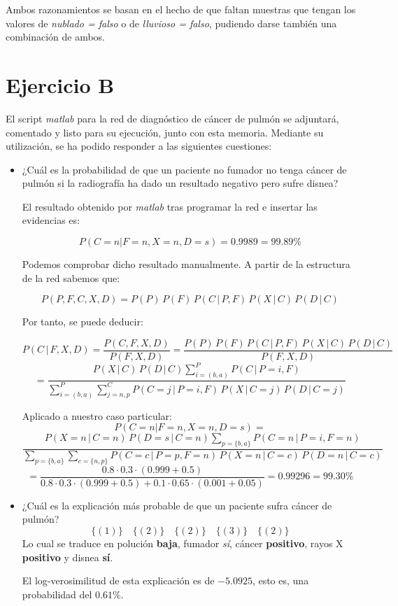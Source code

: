 \documentclass[a4paper]{article}
\begin{document}
\quad Ambos razonamientos se basan en el hecho de que faltan muestras que tengan los valores de \textit{nublado = falso} o de \textit{lluvioso = falso}, pudiendo darse también una combinación de ambos.

\section{Ejercicio B}
\quad El script \textit{matlab} para la red de diagnóstico de cáncer de pulmón se adjuntará, comentado y listo para su ejecución, junto con esta memoria. Mediante su utilización, se ha podido responder a las siguientes cuestiones:

\begin{itemize} 
\item ¿Cuál es la probabilidad de que un paciente no fumador no tenga cáncer de pulmón si la radiografía ha dado un resultado negativo pero sufre disnea?

El resultado obtenido por \textit{matlab} tras programar la red e insertar las evidencias es:

\[ P \left( C = n | F = n, X = n, D = s \right) = 0.9989 = 99.89\% \]

Podemos comprobar dicho resultado manualmente. A partir de la estructura de la red sabemos que:

\[ P(P, F, C, X, D) = P(P)\,P(F)\,P(C\,|\,P,F)\,P(X\,|\,C)\,P(D\,|\,C) \]

Por tanto, se puede deducir:

\[ P(C\,|\,F,X,D) = \dfrac{P(C,F,X,D)}{P(F,X,D)} =\dfrac{P(P)\,P(F)\,P(C\,|\,P,F)\,P(X\,|\,C)\,P(D\,|\,C)}{P(F,X,D)} \]
\[= \dfrac{P(X\,|\,C)\,P(D\,|\,C) \sum^{P}_{i=(b,a)}P(C\,|\,P=i,F)}{\sum^{P}_{i=(b,a)}\sum^{C}_{j=n,p}P(C=j\,|\,P=i,F)\,P(X\,|\,C=j)\,P(D\,|\,C=j)} \]

Aplicado a nuestro caso particular:
\[ P \left( C = n | F = n, X = n, D = s \right) = \]
\[ \dfrac{P(X=n\,|\,C=n)\,P(D=s\,|\,C=n) \sum\limits_{p= \lbrace b,a \rbrace }P(C=n\,|\,P=i,F=n)}{\sum\limits_{p= \lbrace b,a \rbrace }\sum\limits_{c= \lbrace n,p \rbrace }P(C=c\,|\,P=p,F=n)\,P(X=n\,|\,C=c)\,P(D=n\,|\,C=c)} \]
\[ = \dfrac{0.8 \cdot 0.3 \cdot (0.999+0.5)} {0.8 \cdot 0.3 \cdot (0.999+0.5) + 0.1 \cdot 0.65 \cdot (0.001 + 0.05)} = 0.99296 = 99.30\% \]

\item ¿Cuál es la explicación más probable de que un paciente sufra cáncer de pulmón?
\[ \lbrace \left( 1 \right) \rbrace \quad \lbrace \left( 2 \right) \rbrace \quad \lbrace \left( 2 \right) \rbrace \quad \lbrace \left( 3 \right) \rbrace \quad \lbrace \left( 2 \right) \rbrace \]
Lo cual se traduce en polución \textbf{baja}, fumador \textit{sí}, cáncer \textbf{positivo}, rayos X \textbf{positivo} y disnea \textbf{sí}.

El log-verosimilitud de esta explicación es de $-5.0925$, esto es, una probabilidad del $0.61\%$.
\end{itemize}
\end{document}
